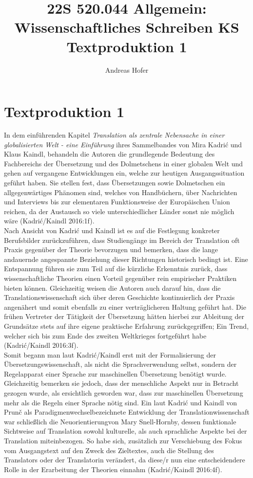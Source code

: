 \documentclass{article}
\title{\vspace{0cm}22S 520.044 Allgemein: Wissenschaftliches Schreiben KS \\ Textproduktion 1}
\author{Andreas Hofer}
\begin{document}
	\section*{Textproduktion 1}
	In dem einführenden Kapitel \textit{ Translation als zentrale Nebensache in einer globalisierten Welt - eine Einführung} ihres Sammelbandes von Mira Kadrić und Klaus Kaindl, behandeln die Autoren die grundlegende Bedeutung des Fachbereichs der Übersetzung und des Dolmetschens in einer globalen Welt und gehen auf vergangene Entwicklungen ein, welche zur heutigen Ausgangssituation geführt haben. Sie stellen fest, dass Übersetzungen sowie Dolmetschen ein allgegenwärtiges Phänomen sind, welches von Handbüchern, über Nachrichten und Interviews bis zur elementaren Funktionsweise der Europäischen Union reichen, da der Austausch so viele unterschiedlicher Länder sonst nie möglich wäre (Kadrić/Kaindl 2016:1f). \\

	Nach Ansicht von Kadrić und Kaindl ist es auf die Festlegung konkreter Berufsbilder zurückzuführen, dass Studiengänge im Bereich der Translation oft Praxis gegenüber der Theorie bevorzugen und bemerken, dass die lange andauernde angespannte Beziehung dieser Richtungen historisch bedingt ist. Eine Entspannung führen sie zum Teil auf die kürzliche Erkenntnis zurück, dass wissenschaftliche Theorien einen Vorteil gegenüber rein empirischer Praktiken bieten können. Gleichzeitig weisen die Autoren auch darauf hin, dass die Translationswissenschaft sich über deren Geschichte kontinuierlich der Praxis angenähert und somit ebenfalls zu einer verträglicheren Haltung geführt hat. Die frühen Vertreter der Tätigkeit der Übersetzung hätten hierbei zur Ableitung der Grundsätze stets auf ihre eigene praktische Erfahrung zurückgegriffen; Ein Trend, welcher sich bis zum Ende des zweiten Weltkrieges fortgeführt habe (Kadrić/Kaindl 2016:3f). \\

	Somit begann man laut Kadrić/Kaindl erst mit der Formalisierung der Übersetzungswissenschaft, als nicht die Sprachverwendung selbst, sondern der Regelapparat einer Sprache zur maschinellen Übersetzung benötigt wurde. Gleichzeitig bemerken sie jedoch, dass der menschliche Aspekt nur in Betracht gezogen wurde, als ersichtlich geworden war, dass zur maschinellen Übersetzung mehr als die Regeln einer Sprache nötig sind. Ein laut Kadrić und Kaindl von Prun\v c als \glqq Paradigmenwechsel\grqq \:bezeichnete Entwicklung der Translationwissenschaft war schließlich die \glqq Neuorientierung\grqq \:von Mary Snell-Hornby, dessen funktionale Sichtweise auf Translation sowohl kulturelle, als auch sprachliche Aspekte bei der Translation miteinbezogen. So habe sich, zusätzlich zur Verschiebung des Fokus vom Ausgangstext auf den Zweck des Zieltextes, auch die Stellung des Translators oder der Translatorin verändert, da diese/r nun eine entscheidendere Rolle in der Erarbeitung der Theorien einnahm (Kadrić/Kaindl 2016:4f). \\ \\
\end{document}
